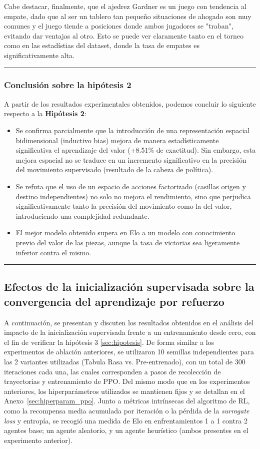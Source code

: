 \documentclass[12pt, a4paper]{article}
\begin{document}
Cabe destacar, finalmente, que el ajedrez Gardner es un juego con tendencia al empate, dado que al ser un tablero tan pequeño situaciones de ahogado son muy comunes y el juego tiende a posiciones donde ambos jugadores se "traban", evitando dar ventajas al otro. Esto se puede ver claramente tanto en el torneo como en las estadístias del dataset, donde la tasa de empates es significativamente alta. 

\rule{\textwidth}{0.2pt}
\subsubsection{Conclusión sobre la hipótesis 2}

A partir de los resultados experimentales obtenidos, podemos concluir lo siguiente respecto a la \textbf{Hipótesis 2}:
\begin{itemize}
    \item Se confirma parcialmente que la introducción de una representación espacial bidimensional (inductivo bias) mejora de manera estadísticamente significativa el aprendizaje del valor (+8.51\% de exactitud). Sin embargo, esta mejora espacial no se traduce en un incremento significativo en la precisión del movimiento supervisado (resultado de la cabeza de política).
    \item Se refuta que el uso de un espacio de acciones factorizado (casillas origen y destino independientes) no solo no mejora el rendimiento, sino que perjudica significativamente tanto la precisión del movimiento como la del valor, introduciendo una complejidad redundante.
    \item El mejor modelo obtenido supera en Elo a un modelo con conocimiento previo del valor de las piezas, aunque la tasa de victorias sea ligeramente inferior contra el mismo.
\end{itemize}

\rule{\textwidth}{0.2pt}
\subsection{Efectos de la inicialización supervisada sobre la convergencia del aprendizaje por refuerzo} \label{sec:rl_results}

A continuación, se presentan y discuten los resultados obtenidos en el análisis del impacto de la inicialización supervisada frente a un entrenamiento desde cero, con el fin de verificar la hipótesis 3 \ref{sec:hipotesis}. De forma similar a los experimentos de ablación anteriores, se utilizaron 10 semillas independientes para las 2 variantes utilizadas (Tabula Rasa vs. Pre-entrenado), con un total de 300 iteraciones cada una, las cuales corresponden a pasos de recolección de trayectorias y entrenamiento de PPO.
Del mismo modo que en los experimentos anteriores, los hiperparámetros utilizados se mantienen fijos y se detallan en el Anexo~\ref{sec:hiperparam_ppo}. Junto a métricas intrínsecas del algoritmo de RL, como la recompensa media acumulada por iteración o la pérdida de la \textit{surrogate loss} y entropía, se recogió una medida de Elo en enfrentamientos 1 a 1 contra 2 agentes base; un agente aleatorio, y un agente heurístico (ambos presentes en el experimento anterior). 
\end{document}
